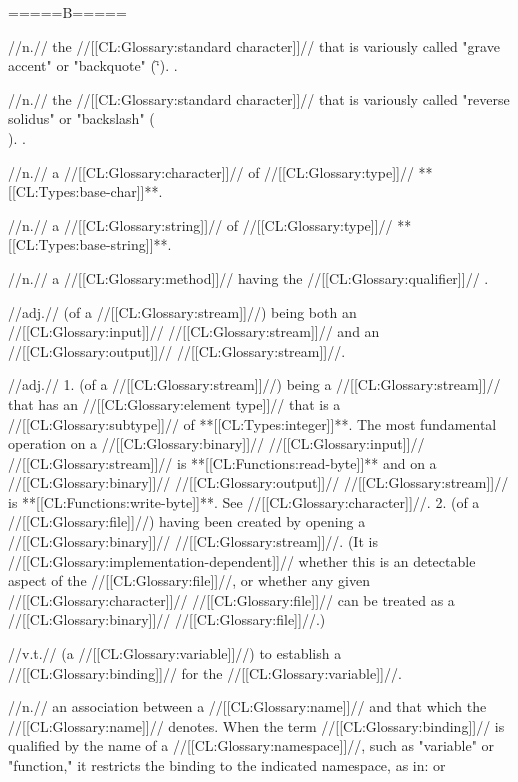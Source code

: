 =====B=====
 
 //n.// the //[[CL:Glossary:standard character]]// that is variously called "grave accent" or "backquote" (\f{`}). \Seefigure\StdCharsThree.

 //n.// the //[[CL:Glossary:standard character]]// that is variously called "reverse solidus" or "backslash" (\f{\\}). \Seefigure\StdCharsThree.

 //n.// a //[[CL:Glossary:character]]//
 of //[[CL:Glossary:type]]// **[[CL:Types:base-char]]**.

 //n.// a //[[CL:Glossary:string]]// of //[[CL:Glossary:type]]// **[[CL:Types:base-string]]**.

 //n.// a //[[CL:Glossary:method]]// having the //[[CL:Glossary:qualifier]]// .

 //adj.// (of a //[[CL:Glossary:stream]]//) being both an //[[CL:Glossary:input]]// //[[CL:Glossary:stream]]// and an //[[CL:Glossary:output]]// //[[CL:Glossary:stream]]//.

 //adj.// 1. (of a //[[CL:Glossary:stream]]//) being a //[[CL:Glossary:stream]]// that has an //[[CL:Glossary:element type]]// that is a //[[CL:Glossary:subtype]]// of **[[CL:Types:integer]]**. The most fundamental operation on a //[[CL:Glossary:binary]]// //[[CL:Glossary:input]]// //[[CL:Glossary:stream]]// is **[[CL:Functions:read-byte]]** and on a //[[CL:Glossary:binary]]// //[[CL:Glossary:output]]// //[[CL:Glossary:stream]]// is **[[CL:Functions:write-byte]]**. See //[[CL:Glossary:character]]//. 2. (of a //[[CL:Glossary:file]]//) having been created by opening a //[[CL:Glossary:binary]]// //[[CL:Glossary:stream]]//. (It is //[[CL:Glossary:implementation-dependent]]// whether this is an detectable aspect of the //[[CL:Glossary:file]]//, or whether any given //[[CL:Glossary:character]]// //[[CL:Glossary:file]]// can be treated as a //[[CL:Glossary:binary]]// //[[CL:Glossary:file]]//.)

 //v.t.// (a //[[CL:Glossary:variable]]//) to establish a //[[CL:Glossary:binding]]// for the //[[CL:Glossary:variable]]//.

 //n.// an association between a //[[CL:Glossary:name]]// and that which the //[[CL:Glossary:name]]// denotes.  When the term //[[CL:Glossary:binding]]// is qualified by the name of a //[[CL:Glossary:namespace]]//, such as "variable" or "function," it restricts the binding to the indicated namespace, as in:  or 
 
